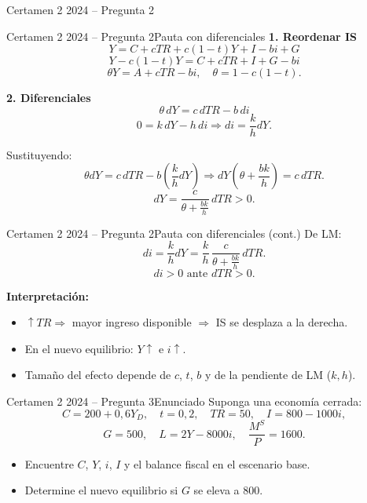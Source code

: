 \documentclass[aspectratio=169]{beamer}
\begin{document}
\begin{frame}{Certamen 2 2024 -- Pregunta 2}
  \vfill
  \centering
  \vfill
\end{frame}

\begin{frame}{Certamen 2 2024 -- Pregunta 2}{Pauta con diferenciales}
\small
\textbf{1. Reordenar IS}
\[
Y = C + cTR + c(1-t)Y + I - bi + G
\]
\[
Y - c(1-t)Y = C + cTR + I + G - bi
\]
\[
\theta Y = A + cTR - bi,\quad \theta = 1 - c(1-t).
\]

\textbf{2. Diferenciales}
\[
\theta\, dY = c\,dTR - b\,di
\]
\[
0 = k\,dY - h\,di \Rightarrow di = \frac{k}{h}dY.
\]

Sustituyendo:
\[
\theta dY = c\,dTR - b\left(\frac{k}{h}dY\right)
\Rightarrow dY\left(\theta + \frac{bk}{h}\right) = c\,dTR.
\]
\[
\boxed{dY = \dfrac{c}{\theta + \frac{bk}{h}}\,dTR > 0.}
\]
\end{frame}

\begin{frame}{Certamen 2 2024 -- Pregunta 2}{Pauta con diferenciales (cont.)}
\small
De LM:
\[
di = \frac{k}{h}dY = \frac{k}{h}\,\dfrac{c}{\theta + \frac{bk}{h}}\,dTR.
\]
\[
\boxed{di > 0 \text{ ante } dTR > 0.}
\]

\textbf{Interpretación:}
\begin{itemize}
  \item $\uparrow TR \Rightarrow$ mayor ingreso disponible $\Rightarrow$ IS se desplaza a la derecha.
  \item En el nuevo equilibrio: $Y \uparrow$ e $i \uparrow$.
  \item Tamaño del efecto depende de $c$, $t$, $b$ y de la pendiente de LM ($k,h$).
\end{itemize}
\end{frame}

\begin{frame}{Certamen 2 2024 -- Pregunta 3}{Enunciado}
\small
Suponga una economía cerrada:
\[
C = 200 + 0{,}6Y_D,\quad t = 0{,}2,\quad TR = 50,\quad I = 800 - 1000i,
\]
\[
G = 500,\quad L = 2Y - 8000i,\quad \frac{M^S}{P} = 1600.
\]
\begin{itemize}
  \item[a)] Encuentre $C$, $Y$, $i$, $I$ y el balance fiscal en el escenario base.
  \item[b)] Determine el nuevo equilibrio si $G$ se eleva a $800$.
\end{itemize}
\end{frame}
\end{document}
